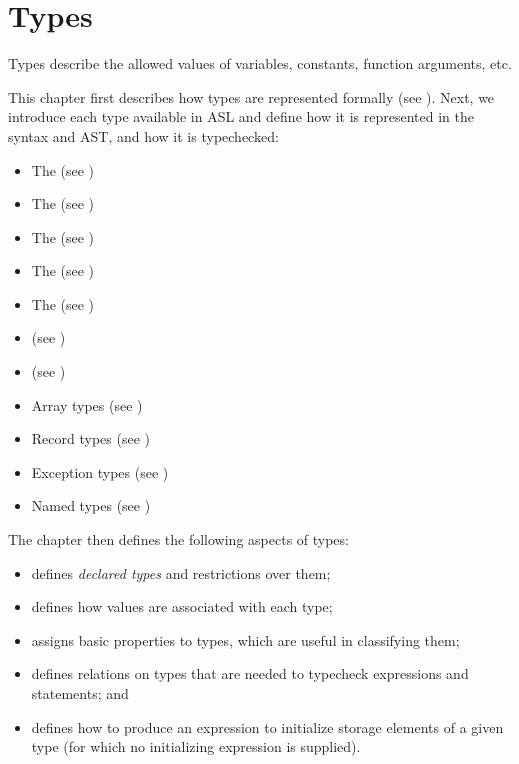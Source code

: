 \chapter{Types\label{chap:Types}}

Types describe the allowed values of variables, constants, function arguments, etc.

This chapter first describes how types are represented formally (see ).
Next, we introduce each type available in ASL and define
how it is represented in the syntax and AST, and how it is typechecked:
\begin{itemize}
  \item The \integertypeterm{} (see )
  \item The \realtypeterm{} (see )
  \item The \stringtypeterm{} (see )
  \item The \booleantypeterm{} (see )
  \item The \bitvectortypeterm{} (see )
  \item \Tupletypesterm{} (see )
  \item \Enumerationtypesterm{} (see )
  \item Array types (see )
  \item Record types (see )
  \item Exception types (see )
  \item Named types (see )
\end{itemize}

The chapter then defines the following aspects of types:
\begin{itemize}
\item {} defines \emph{declared types} and restrictions over them;
\item {} defines how values are associated with each type;
\item {} assigns basic properties to types, which are useful
in classifying them;
\item {} defines relations on types that are needed to typecheck
expressions and statements; and
\item {} defines how to produce an expression to initialize storage
      elements of a given type (for which no initializing expression is supplied).
\end{itemize}

